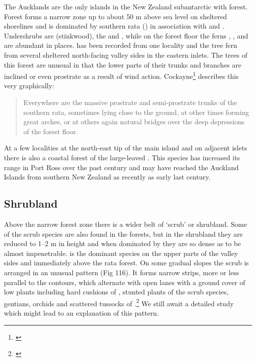 The Aucklands are the only islands in the New Zealand subantarctic with forest.
Forest forms a narrow zone up to about 50 m above sea level on sheltered shorelines and is dominated by southern rata () in association with  and .
Undershrubs are  (stinkwood), the  and , while on the forest floor the ferns , , and  are abundant in places.  has been recorded from one locality and the tree fern  from several sheltered north-facing valley sides in the eastern inlets.
The trees of this forest are unusual in that the lower parts of their trunks and branches are inclined or even prostrate as a result of wind action.
Cockayne\footnote{\cite{cockayne1909ecological}} describes this very graphically:

\begin{quote}
	Everywhere are the massive prostrate and semi-prostrate trunks of the southern rata, sometimes lying close to the ground, at other times forming great arches, or at others again natural bridges over the deep depressions of the forest floor.
\end{quote}

At a few localities at the north-east tip of the main island and on adjacent islets there is also a coastal forest of the large-leaved .
This species has increased its range in Port Ross over the past century and may have reached the Auckland Islands from southern New Zealand as recently as early last century.

\subsection{Shrubland}

Above the narrow forest zone there is a wider belt of `scrub' or shrubland.
Some of the scrub species are also found in the forests, but in the shrubland they are reduced to 1--2 m in height and when dominated by  they are so dense as to be almost impenetrable.  is the dominant species on the upper parts of the valley sides and  immediately above the rata forest.
On some gradual slopes the scrub is arranged in an unusual pattern (Fig 116).
It forms narrow strips, more or less parallel to the contours, which alternate with open lanes with a ground cover of low plants including hard cushions of , stunted plants of the scrub species, gentians, orchids and scattered tussocks of .\footnote{\cite{godley1965notes}}
We still await a detailed study which might lead to an explanation of this pattern.

